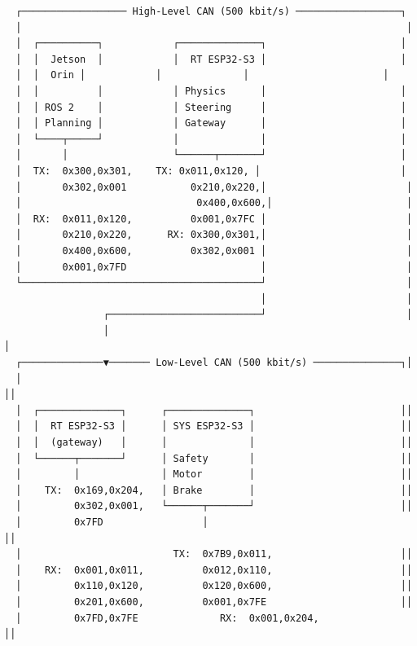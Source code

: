 \begin{verbatim}
  ┌────────────────── High-Level CAN (500 kbit/s) ──────────────────┐
  │                                                                  │
  │  ┌──────────┐            ┌──────────────┐                       │
  │  │  Jetson  │            │  RT ESP32-S3 │                       │
  │  │  Orin │            │              │                       │
  │  │          │            │ Physics      │                       │
  │  │ ROS 2    │            │ Steering     │                       │
  │  │ Planning │            │ Gateway      │                       │
  │  └────┬─────┘            │              │                       │
  │       │                  └──────┬───────┘                       │
  │  TX:  0x300,0x301,    TX: 0x011,0x120, │                        │
  │       0x302,0x001           0x210,0x220,│                        │
  │                              0x400,0x600,│                       │
  │  RX:  0x011,0x120,          0x001,0x7FC │                        │
  │       0x210,0x220,      RX: 0x300,0x301,│                        │
  │       0x400,0x600,          0x302,0x001 │                        │
  │       0x001,0x7FD                       │                        │
  └─────────────────────────────────────────┘                        │
                                            │                        │
                 ┌──────────────────────────┘                        │
                 │                                                    │
  ┌──────────────▼─────── Low-Level CAN (500 kbit/s) ───────────────┐│
  │                                                                  ││
  │  ┌──────────────┐      ┌──────────────┐                         ││
  │  │  RT ESP32-S3 │      │ SYS ESP32-S3 │                         ││
  │  │  (gateway)   │      │              │                         ││
  │  └──────┬───────┘      │ Safety       │                         ││
  │         │              │ Motor        │                         ││
  │    TX:  0x169,0x204,   │ Brake        │                         ││
  │         0x302,0x001,   └──────┬───────┘                         ││
  │         0x7FD                 │                                  ││
  │                          TX:  0x7B9,0x011,                      ││
  │    RX:  0x001,0x011,          0x012,0x110,                      ││
  │         0x110,0x120,          0x120,0x600,                      ││
  │         0x201,0x600,          0x001,0x7FE                       ││
  │         0x7FD,0x7FE              RX:  0x001,0x204,                    ││

\end{verbatim}
